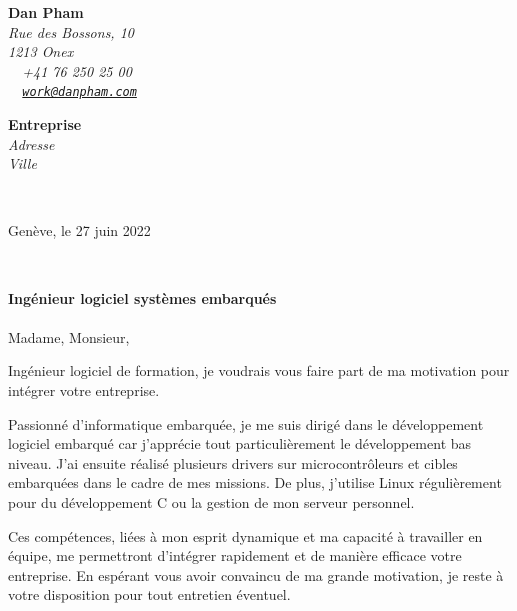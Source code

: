\documentclass[11pt]{article}
\begin{document}
\sffamily   %
\hfill%
\begin{flushleft}
{\bfseries Dan Pham}\\[.35ex]
{\small\itshape
Rue des Bossons, 10\\
1213 Onex\\[.35ex]
~\raisebox{-0.3ex}{\faPhone}~+41 76 250 25 00\\
~\raisebox{-0.1ex}{\faEnvelopeO}~\texttt{\href{mailto:Dan\%20Pham<work@danpham.com>?subject=Contact}{work@danpham.com}}
}\\[3em]

\begin{flushright}

\begin{minipage}[t]{.4\textwidth}
\raggedright
{\bfseries Entreprise}\\[.35ex]
{\small\itshape
Adresse \\
Ville \\}
\end{minipage}\\[2em]

\end{flushright}
\end{flushleft}

\hfill %
\begin{minipage}[t]{.4\textwidth}
        Genève, le 27 juin 2022
\end{minipage}\\[8em]
\raggedright
\textbf{Ingénieur logiciel systèmes embarqués} \\[2em]
\paragraph{}
Madame, Monsieur,
\par
\hspace{0.4cm}Ingénieur logiciel de formation, je voudrais vous faire part de ma motivation pour intégrer votre
entreprise.
\par
\hspace{0.4cm}Passionné d’informatique embarquée, je me suis dirigé dans le développement logiciel embarqué car
j’apprécie tout particulièrement le développement bas niveau. J’ai ensuite réalisé plusieurs drivers sur microcontrôleurs et cibles embarquées dans le cadre de mes missions. De plus, j’utilise Linux régulièrement pour du développement C ou la gestion de mon serveur personnel.
\par
\hspace{0.4cm}Ces compétences, liées à mon esprit dynamique et ma capacité à travailler en équipe, me permettront d’intégrer rapidement et de manière efficace votre entreprise. En espérant vous avoir convaincu de ma grande motivation, je reste à votre disposition pour tout entretien éventuel.
\end{document}
